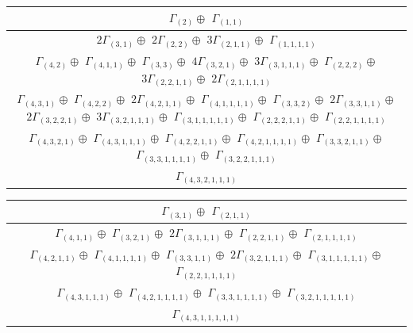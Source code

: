 \documentclass[main.tex]{subfiles}
\begin{document}
\bigskip
\begin{minipage}{1\textwidth}
\footnotesize
\begin{tabular}{c}
$\Gamma_{(
2
)} \oplus$
$\Gamma_{(
1 , 
1
)}$
\\ \hline
$ 2 \Gamma_{(
3 , 
1
)} \oplus$
$ 2 \Gamma_{(
2 , 
2
)} \oplus$
$ 3 \Gamma_{(
2 , 
1 , 
1
)} \oplus$
$\Gamma_{(
1 , 
1 , 
1 , 
1
)}$
\\ \hline
$\Gamma_{(
4 , 
2
)} \oplus$
$\Gamma_{(
4 , 
1 , 
1
)} \oplus$
$\Gamma_{(
3 , 
3
)} \oplus$
$ 4 \Gamma_{(
3 , 
2 , 
1
)} \oplus$
$ 3 \Gamma_{(
3 , 
1 , 
1 , 
1
)} \oplus$
$\Gamma_{(
2 , 
2 , 
2
)} \oplus$
$ 3 \Gamma_{(
2 , 
2 , 
1 , 
1
)} \oplus$
$ 2 \Gamma_{(
2 , 
1 , 
1 , 
1 , 
1
)}$
\\ \hline
$\Gamma_{(
4 , 
3 , 
1
)} \oplus$
$\Gamma_{(
4 , 
2 , 
2
)} \oplus$
$ 2 \Gamma_{(
4 , 
2 , 
1 , 
1
)} \oplus$
$\Gamma_{(
4 , 
1 , 
1 , 
1 , 
1
)} \oplus$
$\Gamma_{(
3 , 
3 , 
2
)} \oplus$
$ 2 \Gamma_{(
3 , 
3 , 
1 , 
1
)} \oplus$
$ 2 \Gamma_{(
3 , 
2 , 
2 , 
1
)} \oplus$
$ 3 \Gamma_{(
3 , 
2 , 
1 , 
1 , 
1
)} \oplus$
$\Gamma_{(
3 , 
1 , 
1 , 
1 , 
1 , 
1
)} \oplus$
$\Gamma_{(
2 , 
2 , 
2 , 
1 , 
1
)} \oplus$
$\Gamma_{(
2 , 
2 , 
1 , 
1 , 
1 , 
1
)}$
\\ \hline
$\Gamma_{(
4 , 
3 , 
2 , 
1
)} \oplus$
$\Gamma_{(
4 , 
3 , 
1 , 
1 , 
1
)} \oplus$
$\Gamma_{(
4 , 
2 , 
2 , 
1 , 
1
)} \oplus$
$\Gamma_{(
4 , 
2 , 
1 , 
1 , 
1 , 
1
)} \oplus$
$\Gamma_{(
3 , 
3 , 
2 , 
1 , 
1
)} \oplus$
$\Gamma_{(
3 , 
3 , 
1 , 
1 , 
1 , 
1
)} \oplus$
$\Gamma_{(
3 , 
2 , 
2 , 
1 , 
1 , 
1
)}$
\\ \hline
$\Gamma_{(
4 , 
3 , 
2 , 
1 , 
1 , 
1
)}$
\\
\end{tabular}\end{minipage}
\bigskip
\begin{minipage}{1\textwidth}
\centering
\begin{tabular}{c}
$\Gamma_{(
3 , 
1
)} \oplus$
$\Gamma_{(
2 , 
1 , 
1
)}$
\\ \hline
$\Gamma_{(
4 , 
1 , 
1
)} \oplus$
$\Gamma_{(
3 , 
2 , 
1
)} \oplus$
$ 2 \Gamma_{(
3 , 
1 , 
1 , 
1
)} \oplus$
$\Gamma_{(
2 , 
2 , 
1 , 
1
)} \oplus$
$\Gamma_{(
2 , 
1 , 
1 , 
1 , 
1
)}$
\\ \hline
$\Gamma_{(
4 , 
2 , 
1 , 
1
)} \oplus$
$\Gamma_{(
4 , 
1 , 
1 , 
1 , 
1
)} \oplus$
$\Gamma_{(
3 , 
3 , 
1 , 
1
)} \oplus$
$ 2 \Gamma_{(
3 , 
2 , 
1 , 
1 , 
1
)} \oplus$
$\Gamma_{(
3 , 
1 , 
1 , 
1 , 
1 , 
1
)} \oplus$
$\Gamma_{(
2 , 
2 , 
1 , 
1 , 
1 , 
1
)}$
\\ \hline
$\Gamma_{(
4 , 
3 , 
1 , 
1 , 
1
)} \oplus$
$\Gamma_{(
4 , 
2 , 
1 , 
1 , 
1 , 
1
)} \oplus$
$\Gamma_{(
3 , 
3 , 
1 , 
1 , 
1 , 
1
)} \oplus$
$\Gamma_{(
3 , 
2 , 
1 , 
1 , 
1 , 
1 , 
1
)}$
\\ \hline
$\Gamma_{(
4 , 
3 , 
1 , 
1 , 
1 , 
1 , 
1
)}$
\\
\end{tabular}\end{minipage}
\end{document}
